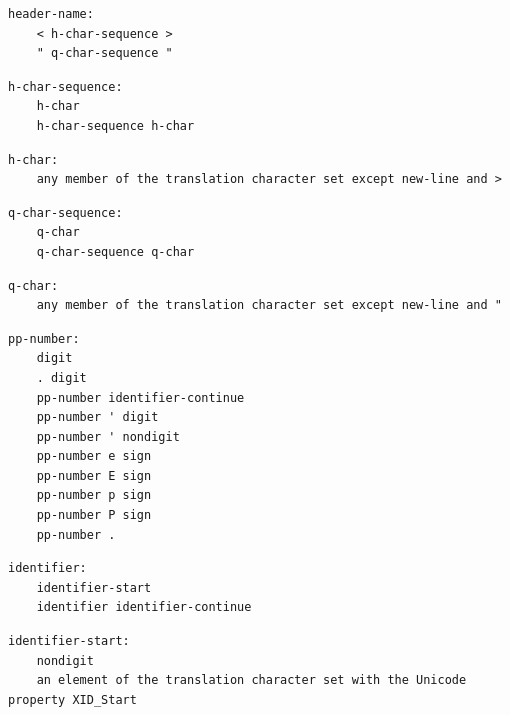 \noindent\textbf{\texttt{}}\par
\begin{lstlisting}
header-name:
    < h-char-sequence >
    " q-char-sequence "
\end{lstlisting}

\noindent\textbf{\texttt{}}\par
\begin{lstlisting}
h-char-sequence:
    h-char
    h-char-sequence h-char
\end{lstlisting}

\noindent\textbf{\texttt{}}\par
\begin{lstlisting}
h-char:
    any member of the translation character set except new-line and >
\end{lstlisting}

\noindent\textbf{\texttt{}}\par
\begin{lstlisting}
q-char-sequence:
    q-char
    q-char-sequence q-char
\end{lstlisting}

\noindent\textbf{\texttt{}}\par
\begin{lstlisting}
q-char:
    any member of the translation character set except new-line and "
\end{lstlisting}

\noindent\textbf{\texttt{}}\par
\begin{lstlisting}
pp-number:
    digit
    . digit
    pp-number identifier-continue
    pp-number ' digit
    pp-number ' nondigit
    pp-number e sign
    pp-number E sign
    pp-number p sign
    pp-number P sign
    pp-number .
\end{lstlisting}

\noindent\textbf{\texttt{}}\par
\begin{lstlisting}
identifier:
    identifier-start
    identifier identifier-continue
\end{lstlisting}

\noindent\textbf{\texttt{}}\par
\begin{lstlisting}
identifier-start:
    nondigit
    an element of the translation character set with the Unicode property XID_Start
\end{lstlisting}


